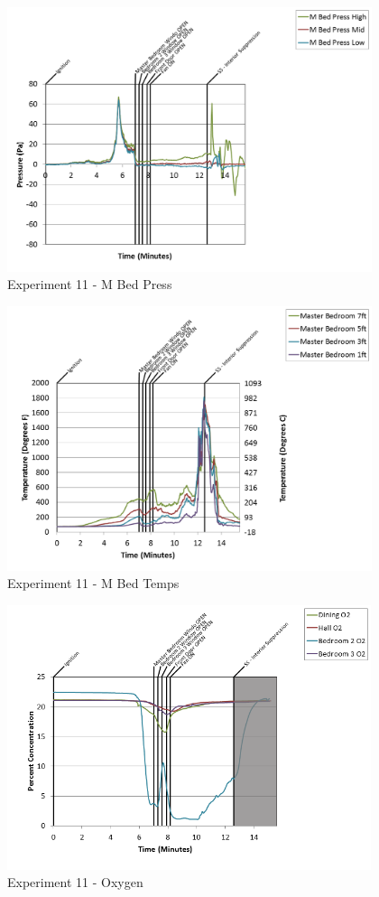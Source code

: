 \documentclass{article}
\begin{document}
\begin{appendices}
\begin{figure}[h!]
	\centering
	\includegraphics[height=3.05in]{0_Images/Results_Charts/Exp_11_Charts/MBedPress.png}
	\caption{Experiment 11 - M Bed Press}
\end{figure}

\clearpage

\begin{figure}[h!]
	\centering
	\includegraphics[height=3.05in]{0_Images/Results_Charts/Exp_11_Charts/MBedTemps.png}
	\caption{Experiment 11 - M Bed Temps}
\end{figure}


\begin{figure}[h!]
	\centering
	\includegraphics[height=3.05in]{0_Images/Results_Charts/Exp_11_Charts/Oxygen.png}
	\caption{Experiment 11 - Oxygen}
\end{figure}


\end{appendices}
\end{document}
